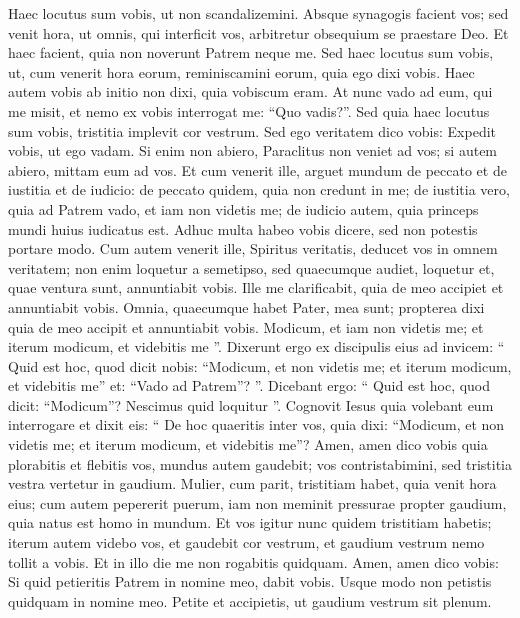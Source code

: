 \begin{biblechapter}
\begin{biblechapter}
\begin{biblechapter}
\begin{biblechapter}
\begin{biblechapter}
\begin{biblechapter}
\begin{biblechapter}
\begin{biblechapter}
\begin{biblechapter}
\begin{biblechapter}
\begin{biblechapter}
\begin{biblechapter}
\begin{biblechapter}
\begin{biblechapter}
\begin{biblechapter}
\begin{biblechapter}
\verse Haec locutus sum vobis, ut non scandalizemini. 
\verse Absque synagogis facient vos; sed venit hora, ut omnis, qui interficit vos, arbitretur obsequium se praestare Deo. 
\verse Et haec facient, quia non noverunt Patrem neque me. 
\verse Sed haec locutus sum vobis, ut, cum venerit hora eorum, reminiscamini eorum, quia ego dixi vobis. Haec autem vobis ab initio non dixi, quia vobiscum eram.
 \verse At nunc vado ad eum, qui me misit, et nemo ex vobis interrogat me: “Quo vadis?”. 
\verse Sed quia haec locutus sum vobis, tristitia implevit cor vestrum. 
 \verse Sed ego veritatem dico vobis: Expedit vobis, ut ego vadam. Si enim non abiero, Paraclitus non veniet ad vos; si autem abiero, mittam eum ad vos. 
\verse Et cum venerit ille, arguet mundum de peccato et de iustitia et de iudicio: 
\verse de peccato quidem, quia non credunt in me; 
\verse de iustitia vero, quia ad Patrem vado, et iam non videtis me; 
\verse de iudicio autem, quia princeps mundi huius iudicatus est.
 \verse Adhuc multa habeo vobis dicere, sed non potestis portare modo. 
\verse Cum autem venerit ille, Spiritus veritatis, deducet vos in omnem veritatem; non enim loquetur a semetipso, sed quaecumque audiet, loquetur et, quae ventura sunt, annuntiabit vobis. 
\verse Ille me clarificabit, quia de meo accipiet et annuntiabit vobis. 
\verse Omnia, quaecumque habet Pater, mea sunt; propterea dixi quia de meo accipit et annuntiabit vobis.
 \verse Modicum, et iam non videtis me; et iterum modicum, et videbitis me ”. 
\verse Dixerunt ergo ex discipulis eius ad invicem: “ Quid est hoc, quod dicit nobis: “Modicum, et non videtis me; et iterum modicum, et videbitis me” et: “Vado ad Patrem”? ”. 
\verse Dicebant ergo: “ Quid est hoc, quod dicit: “Modicum”? Nescimus quid loquitur ”. 
\verse Cognovit Iesus quia volebant eum interrogare et dixit eis: “ De hoc quaeritis inter vos, quia dixi: “Modicum, et non videtis me; et iterum modicum, et videbitis me”? 
\verse Amen, amen dico vobis quia plorabitis et flebitis vos, mundus autem gaudebit; vos contristabimini, sed tristitia vestra vertetur in gaudium. 
\verse Mulier, cum parit, tristitiam habet, quia venit hora eius; cum autem pepererit puerum, iam non meminit pressurae propter gaudium, quia natus est homo in mundum. 
\verse Et vos igitur nunc quidem tristitiam habetis; iterum autem videbo vos, et gaudebit cor vestrum, et gaudium vestrum nemo tollit a vobis. 
\verse Et in illo die me non rogabitis quidquam.
 Amen, amen dico vobis: Si quid petieritis Patrem in nomine meo, dabit vobis. 
 \verse Usque modo non petistis quidquam in nomine meo. Petite et accipietis, ut gaudium vestrum sit plenum. 

\end{biblechapter}
\end{biblechapter}
\end{biblechapter}
\end{biblechapter}
\end{biblechapter}
\end{biblechapter}
\end{biblechapter}
\end{biblechapter}
\end{biblechapter}
\end{biblechapter}
\end{biblechapter}
\end{biblechapter}
\end{biblechapter}
\end{biblechapter}
\end{biblechapter}
\end{biblechapter}
